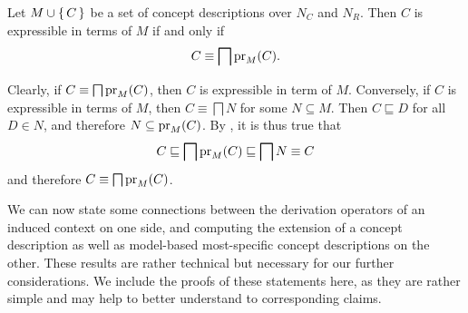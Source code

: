 \begin{Lemma}
  \label{lem:characterizing-expressible-in-terms-of}
  Let $M \cup {\ensuremath{\{\,C\,\}}}$ be a set of concept descriptions over $N_C$ and $N_R$.  Then $C$ is
  expressible in terms of $M$ if and only if
  \begin{equation*}
    C \equiv \bigsqcap \operatorname{pr}_M(C).
  \end{equation*}
\end{Lemma}
\begin{Proof}
  Clearly, if $C \equiv \bigsqcap \operatorname{pr}_M(C)$, then $C$ is expressible in term of $M$.
  Conversely, if $C$ is expressible in terms of $M$, then $C \equiv \bigsqcap N$ for some
  $N \subseteq M$.  Then $C \sqsubseteq D$ for all $D \in N$, and therefore $N \subseteq
  \operatorname{pr}_M(C)$.  By , it is thus true that
  \begin{equation*}
    C \sqsubseteq \bigsqcap \operatorname{pr}_M(C) \sqsubseteq \bigsqcap N \equiv C
  \end{equation*}
  and therefore $C \equiv \bigsqcap \operatorname{pr}_M(C)$.
\end{Proof}

We can now state some connections between the derivation operators of an induced context
on one side, and computing the extension of a concept description as well as model-based
most-specific concept descriptions on the other.  These results are rather technical but
necessary for our further considerations.  We include the proofs of these statements here,
as they are rather simple and may help to better understand to corresponding claims.

